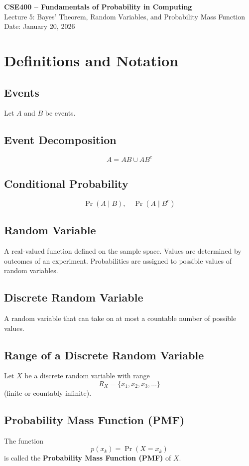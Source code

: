 \documentclass[11pt]{article}
\begin{document}
\begin{center}
{\Large \textbf{CSE400 – Fundamentals of Probability in Computing}}\\[4pt]
{\large Lecture 5: Bayes’ Theorem, Random Variables, and Probability Mass Function}\\[4pt]
Date: January 20, 2026
\end{center}

\section*{Definitions and Notation}

\subsection*{Events}
Let $A$ and $B$ be events.

\subsection*{Event Decomposition}
\[
A = AB \cup AB^{c}
\]

\subsection*{Conditional Probability}
\[
\Pr(A \mid B), \quad \Pr(A \mid B^{c})
\]

\subsection*{Random Variable}
A real-valued function defined on the sample space. Values are determined by outcomes of an experiment. Probabilities are assigned to possible values of random variables.

\subsection*{Discrete Random Variable}
A random variable that can take on at most a countable number of possible values.

\subsection*{Range of a Discrete Random Variable}
Let $X$ be a discrete random variable with range
\[
R_X = \{x_1, x_2, x_3, \dots\}
\]
(finite or countably infinite).

\subsection*{Probability Mass Function (PMF)}
The function
\[
p(x_k) = \Pr(X = x_k)
\]
is called the \textbf{Probability Mass Function (PMF)} of $X$.
\end{document}
